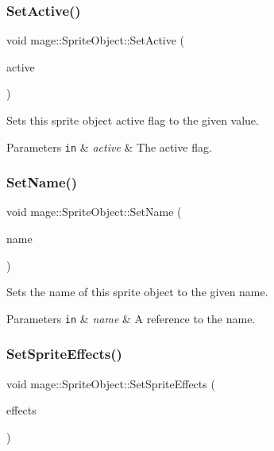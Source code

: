 \subsubsection{\texorpdfstring{Set\+Active()}{SetActive()}}
{\footnotesize\ttfamily void mage\+::\+Sprite\+Object\+::\+Set\+Active (\begin{DoxyParamCaption}\item[{bool}]{active }\end{DoxyParamCaption})}

Sets this sprite object active flag to the given value.


\begin{DoxyParams}[1]{Parameters}
\mbox{\tt in}  & {\em active} & The active flag. \\
\hline
\end{DoxyParams}
\hypertarget{classmage_1_1_sprite_object_a784cd7d61f3a9f71a521656ae3199366}{}\label{classmage_1_1_sprite_object_a784cd7d61f3a9f71a521656ae3199366} 
\subsubsection{\texorpdfstring{Set\+Name()}{SetName()}}
{\footnotesize\ttfamily void mage\+::\+Sprite\+Object\+::\+Set\+Name (\begin{DoxyParamCaption}\item[{const string \&}]{name }\end{DoxyParamCaption})}

Sets the name of this sprite object to the given name.


\begin{DoxyParams}[1]{Parameters}
\mbox{\tt in}  & {\em name} & A reference to the name. \\
\hline
\end{DoxyParams}
\hypertarget{classmage_1_1_sprite_object_ad2eb556b5965d894e81cca96c5c0540b}{}\label{classmage_1_1_sprite_object_ad2eb556b5965d894e81cca96c5c0540b} 
\subsubsection{\texorpdfstring{Set\+Sprite\+Effects()}{SetSpriteEffects()}}
{\footnotesize\ttfamily void mage\+::\+Sprite\+Object\+::\+Set\+Sprite\+Effects (\begin{DoxyParamCaption}\item[{\hyperlink{namespacemage_a9cfe18123066ba4236f548f9de75d881}{Sprite\+Effect}}]{effects }\end{DoxyParamCaption})}

